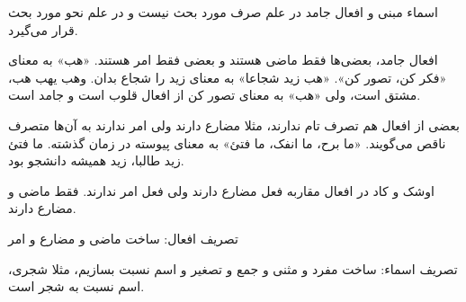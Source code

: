 \documentclass{article}
\begin{document}
\begin{addpage}{5}
\vspace*{3cm}
\begin{note}
  اسماء مبنی و افعال جامد در علم صرف مورد بحث نیست و در علم نحو مورد بحث قرار می‌گیرد.
\end{note}
\begin{note}
افعال جامد، بعضی‌ها فقط ماضی هستند و بعضی فقط امر هستند. «هب» به معنای «فکر کن، تصور کن». «هب زید شجاعا» به معنای زید را شجاع بدان.
وهب یهب هب، مشتق است، ولی «هب» به معنای تصور کن از افعال قلوب است و جامد است.
\end{note}
\begin{note}
بعضی از افعال هم تصرف تام ندارند، مثلا مضارع دارند ولی امر ندارند به آن‌ها متصرف ناقص می‌گویند. «ما برح، ما انفک، ما فتئ» به معنای پیوسته در زمان گذشته.
ما فتئ زید طالبا، زید همیشه دانشجو بود.
\end{note}
\begin{note}
  اوشک و کاد در افعال مقاربه فعل مضارع دارند ولی فعل امر ندارند. فقط ماضی و مضارع دارند.
\end{note}
\vspace*{3cm}
\begin{note}
  تصریف افعال: ساخت ماضی و مضارع و امر
\end{note}
\begin{note}
  تصریف اسماء: ساخت مفرد و مثنی و جمع و تصغیر و اسم نسبت بسازیم، مثلا شجری، اسم نسبت به شجر است.
\end{note}
\end{addpage}
\end{document}
